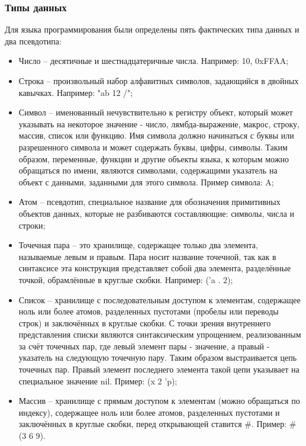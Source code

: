 \subsubsection{Типы данных}
Для языка программирования были определены пять фактических типа данных и два псевдотипа:
\begin{itemize}
	\item Число -- десятичные и шестнадцатеричные числа. Например: 10, 0xFFAA;
	
	\item Строка -- произвольный набор алфавитных символов, задающийся в двойных кавычках. Например: "ab 12 /";
	
	\item Символ -- именованный нечувствительно к регистру объект, который может указывать на некоторое значение - число, лямбда-выражение, макрос, строку, массив, список или функцию. Имя символа должно начинаться с буквы или разрешенного символа и может содержать буквы, цифры, символы. Таким образом, переменные, функции и другие объекты языка, к которым можно обращаться по имени, являются символами, содержащими указатель на объект с данными, заданными для этого символа. Пример символа: A;
	
	\item Атом -- псевдотип, специальное название для обозначения примитивных объектов данных, которые не разбиваются составляющие: символы, числа и строки;
	
	\item Точечная пара -- это хранилище, содержащее только два элемента, называемые левым и правым. Пара носит название точечной, так как в синтаксисе эта конструкция представляет собой два элемента, разделённые точкой, обрамлённые в круглые скобки. Например: ('a . 2);
	
	\item Список -- хранилище с последовательным доступом к элементам, содержащее ноль или более атомов, разделенных пустотами (пробелы или переводы строк) и заключённых в круглые скобки. С точки зрения внутреннего представления списки являются синтаксическим упрощением, реализованным за счёт точечных пар, где левый элемент пары - значение, а правый - указатель на следующую точечную пару. Таким образом выстраивается цепь точечных пар. Правый элемент последнего элемента такой цепи указывает на специальное значение nil. Пример: (x 2 'p);
	
	\item Массив -- хранилище с прямым доступом к элементам (можно обращаться по индексу), содержащее ноль или более атомов, разделенных пустотами и заключённых в круглые скобки, перед открывающей ставится \#. Пример: \#(3 6 9).
\end{itemize}

